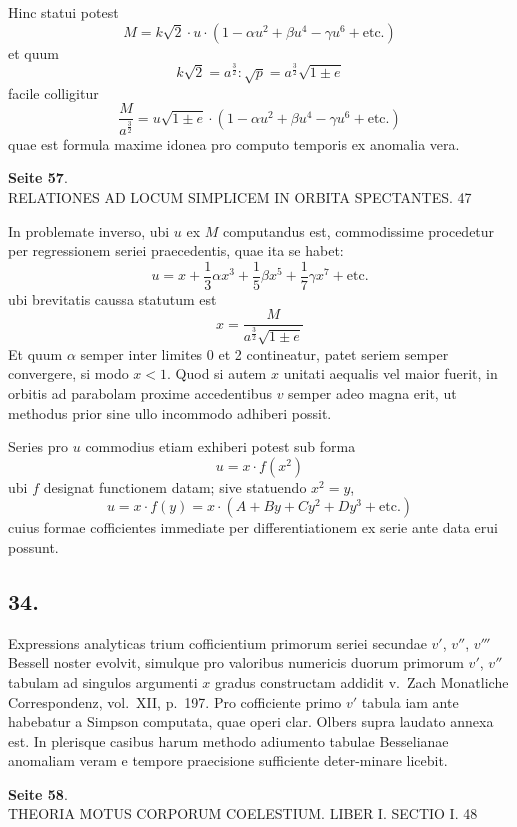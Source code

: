 \documentclass[12pt,a4paper]{article}
\begin{document}
Hinc statui potest
\[
M = k \sqrt{2} \cdot u \cdot (1 - \alpha u^2 + \beta u^4 - \gamma u^6 + \text{etc.})
\]
et quum
\[
k \sqrt{2} = a^{\frac{3}{2}} : \sqrt{p} = a^{\frac{3}{2}} \sqrt{1 \pm e}
\]
facile colligitur
\[
\frac{M}{a^{\frac{3}{2}}} = u \sqrt{1 \pm e} \cdot (1 - \alpha u^2 + \beta u^4 - \gamma u^6 + \text{etc.})
\]
quae est formula maxime idonea pro computo temporis ex anomalia vera.

\textbf{Seite 57}.\\
RELATIONES AD LOCUM SIMPLICEM IN ORBITA SPECTANTES. 47

In problemate inverso, ubi $u$ ex $M$ computandus est, commodissime procedetur per regressionem seriei praecedentis, quae ita se habet:
\[
u = x + \frac{1}{3}\alpha x^3 + \frac{1}{5}\beta x^5 + \frac{1}{7}\gamma x^7 + \text{etc.}
\]
ubi brevitatis caussa statutum est
\[
x = \frac{M}{a^{\frac{3}{2}} \sqrt{1 \pm e}}
\]
Et quum $\alpha$ semper inter limites 0 et 2 contineatur, patet seriem semper convergere, si modo $x < 1$. Quod si autem $x$ unitati aequalis vel maior fuerit, in orbitis ad parabolam proxime accedentibus $v$ semper adeo magna erit, ut methodus prior sine ullo incommodo adhiberi possit.

Series pro $u$ commodius etiam exhiberi potest sub forma
\[
u = x \cdot f(x^2)
\]
ubi $f$ designat functionem datam; sive statuendo $x^2 = y$,
\[
u = x \cdot f(y) = x \cdot (A + By + Cy^2 + Dy^3 + \text{etc.})
\]
cuius formae cofficientes immediate per differentiationem ex serie ante data erui possunt.

\subsection*{34.}

Expressions analyticas trium cofficientium primorum seriei secundae $v'$, $v''$, $v'''$ Bessell noster evolvit, simulque pro valoribus numericis duorum primorum $v'$, $v''$ tabulam ad singulos argumenti $x$ gradus constructam addidit v.~Zach Monatliche Correspondenz, vol.~XII, p.~197. Pro cofficiente primo $v'$ tabula iam ante habebatur a Simpson computata, quae operi clar. Olbers supra laudato annexa est. In plerisque casibus harum methodo adiumento tabulae Besselianae anomaliam veram e tempore praecisione sufficiente deter-\linebreak minare licebit.

\textbf{Seite 58}.\\
THEORIA MOTUS CORPORUM COELESTIUM. LIBER I. SECTIO I. 48
\end{document}
